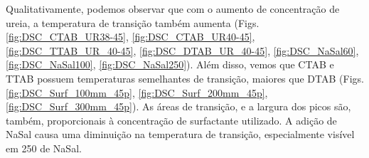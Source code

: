 		
		Qualitativamente, podemos observar que com o aumento de concentração de ureia, a temperatura de transição também aumenta (Figs. \ref{fig:DSC_CTAB_UR38-45}, \ref{fig:DSC_CTAB_UR40-45}, \ref{fig:DSC_TTAB_UR_40-45}, \ref{fig:DSC_DTAB_UR_40-45}, \ref{fig:DSC_NaSal60}, \ref{fig:DSC_NaSal100}, \ref{fig:DSC_NaSal250}). Além disso, vemos que CTAB e TTAB possuem temperaturas semelhantes de transição, maiores que DTAB (Figs. \ref{fig:DSC_Surf_100mm_45p}, \ref{fig:DSC_Surf_200mm_45p}, \ref{fig:DSC_Surf_300mm_45p}). As áreas de transição, e a largura dos picos são, também, proporcionais à concentração de surfactante utilizado. A adição de NaSal causa uma diminuição na temperatura de transição, especialmente visível em 250\mM{} de NaSal.

